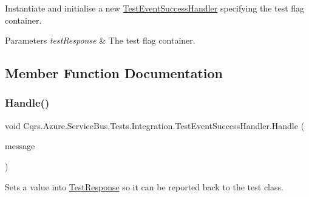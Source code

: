 Instantiate and initialise a new \hyperlink{classCqrs_1_1Azure_1_1ServiceBus_1_1Tests_1_1Integration_1_1TestEventSuccessHandler}{Test\+Event\+Success\+Handler} specifying the test flag container. 


\begin{DoxyParams}{Parameters}
{\em test\+Response} & The test flag container.\\
\hline
\end{DoxyParams}


\subsection{Member Function Documentation}
\mbox{\label{classCqrs_1_1Azure_1_1ServiceBus_1_1Tests_1_1Integration_1_1TestEventSuccessHandler_a6091c03591fd162a96fcba89a40f8d2f_a6091c03591fd162a96fcba89a40f8d2f}} 
\subsubsection{\texorpdfstring{Handle()}{Handle()}}
{\footnotesize\ttfamily void Cqrs.\+Azure.\+Service\+Bus.\+Tests.\+Integration.\+Test\+Event\+Success\+Handler.\+Handle (\begin{DoxyParamCaption}\item[{\hyperlink{classCqrs_1_1Azure_1_1ServiceBus_1_1Tests_1_1Unit_1_1TestEvent}{Test\+Event}}]{message }\end{DoxyParamCaption})}



Sets a value into \hyperlink{classCqrs_1_1Azure_1_1ServiceBus_1_1Tests_1_1Integration_1_1TestEventSuccessHandler_a01443ad3c6558530400b8cff76796fca_a01443ad3c6558530400b8cff76796fca}{Test\+Response} so it can be reported back to the test class. 



